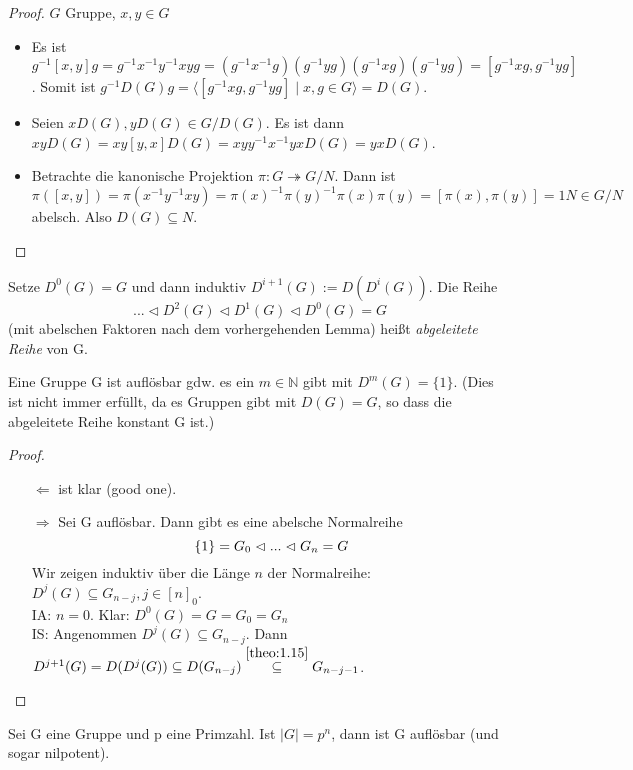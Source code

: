 \documentclass[../main.tex]{subfiles}
\begin{document}
\begin{proof}
$G$ Gruppe, $x, y \in G$
\begin{itemize}
    \item Es ist $g^{-1}[x,y]g = g^{-1}x^{-1}y^{-1}xyg = (g^{-1}x^{-1}g)(g^{-1}yg)(g^{-1}xg)(g^{-1}yg) = [g^{-1}xg, g^{-1}yg]$. Somit ist $g^{-1}D(G)g = \langle[g^{-1}xg, g^{-1}yg] \mid x,g \in G\rangle = D(G)$.
    
    \item Seien $xD(G), yD(G) \in G/D(G)$. Es ist dann $xyD(G) = xy[y,x]D(G) = xyy^{-1}x^{-1}yxD(G) = yxD(G)$. 
    
    \item Betrachte die kanonische Projektion $\pi: G \twoheadrightarrow G/N$. Dann ist $\pi([x,y]) = \pi(x^{-1}y^{-1}xy) = \pi(x)^{-1}\pi(y)^{-1}\pi(x)\pi(y) = [\pi(x), \pi(y)] = 1N \in G/N$ abelsch.
    Also $D(G) \subseteq N$.
\end{itemize}
\end{proof}
\begin{definition}
    Setze $D^0(G) = G$ und dann induktiv $D^{i+1}(G) := D(D^i(G))$. Die Reihe 
    $$... \triangleleft D^2(G) \triangleleft D^1(G) \triangleleft D^0(G) = G$$
    (mit abelschen Faktoren nach dem vorhergehenden Lemma) heißt \emph{abgeleitete Reihe} von G.
\end{definition}
\begin{theorem}
    Eine Gruppe G ist auflösbar gdw. es ein $m \in \mathbb{N}$ gibt mit $D^m(G) = \{1\}$. (Dies ist nicht immer erfüllt, da es Gruppen gibt mit $D(G) = G$, so dass die abgeleitete Reihe konstant G ist.)
\end{theorem}
\begin{proof}$ $
    \begin{itemize}
        \item[$\Leftarrow$] ist klar (good one).
        \item[$\Rightarrow$]
        Sei G auflösbar. Dann gibt es eine abelsche Normalreihe
        $$\{1\} = G_0 \vartriangleleft ... \vartriangleleft G_n = G$$
        Wir zeigen induktiv über die Länge $n$ der Normalreihe: $D^j(G) \subseteq G_{n-j}, j \in [n]_0$.\\
        IA: $n=0$. Klar: $D^0(G) = G = G_0 = G_n$\\
        IS: Angenommen $D^j(G) \subseteq G_{n-j}$. Dann $D^{j+1}(G) = D(D^j(G)) \subseteq D(G_{n-j}) \overset{\ref{theo:1.15}}{\subseteq} G_{n-j-1}$.
    \end{itemize}
\end{proof}
\begin{example}
    Sei G eine Gruppe und p eine Primzahl. Ist $|G| = p^n$, dann ist G auflösbar (und sogar nilpotent).
\end{example}
\end{document}
